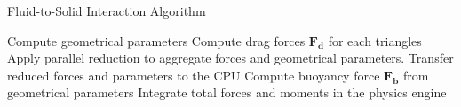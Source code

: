 \begin{algorithm}
\caption{Fluid-to-Solid Interaction Algorithm}
\label{alg:fluid_to_solid}
\begin{algorithmic}[1]
 
\State Compute geometrical parameters 
\State Compute drag forces $\mathbf{F_d}$ for each triangles
\EndFor
\State Apply parallel reduction to aggregate forces and geometrical parameters.
\State Transfer reduced forces and parameters to the CPU
\State Compute buoyancy force $\mathbf{F_b}$ from geometrical parameters 
\State Integrate total forces and moments in the physics engine
\end{algorithmic}
\end{algorithm}
